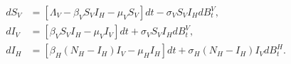 \begin{equation} \label{eqn:sto_vector_host}
    \begin{aligned}
        d S_V &= 
            \left [
                \Lambda_V - \beta_V S_V I_H - \mu_V S_V 
            \right ] dt
            - \sigma_V S_V I_H dB_t^V,
            \\
        d I_V &= 
            \left [
               \beta_V S_V I_H - \mu_V I_V 
            \right ]
            dt 
            + \sigma_V S_V I_H dB_t^V,
            \\
        d I_H &= 
            \left [
                \beta_H (N_H - I_H) I_V - \mu_H I_H
            \right ] dt
            + \sigma_H (N_H - I_H) I_V d B^H_t .
   \end{aligned}
\end{equation}